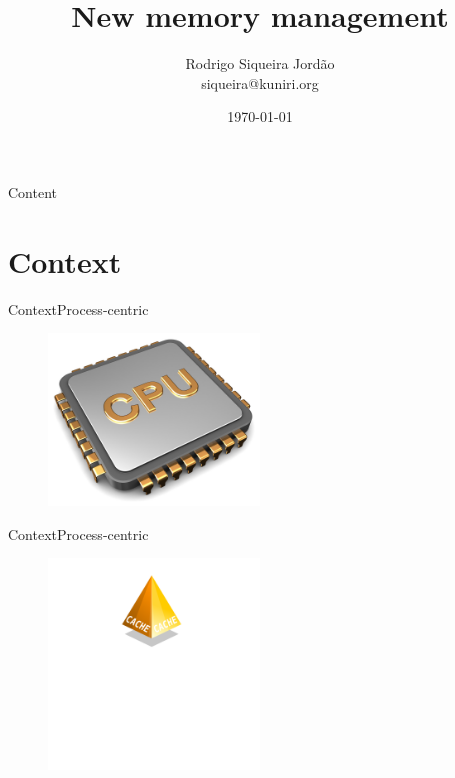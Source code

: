 \documentclass[10pt]{beamer}
\title[] %
{ %
  \textbf{New memory management}
}
\subtitle[SpaceJMP a new approach]
{
}
\author[Rodrigo Siqueira Jordão]
{      Rodrigo Siqueira Jordão \\
      {\ttfamily siqueira@kuniri.org}
}
\institute[]
{
  University of Sao Paulo\\
  Institute of Mathematics and Statistics\\
  
}
\date{\today}
\begin{document}

{\1%
\begin{frame} 
  \titlepage %
\end{frame}}

\begin{frame}[shrink]{Content}{}
  \tableofcontents
\end{frame}

\section{Context}
\begin{frame}{Context}{Process-centric}
  \begin{figure}[ht]
    \centering
    \includegraphics[width=0.5\textwidth, keepaspectratio=true]{images/processor-centric.png}
  \end{figure}
\end{frame}

\begin{frame}{Context}{Process-centric}
  \begin{figure}[ht]
    \centering
    \includegraphics[width=0.5\textwidth, keepaspectratio=true]{images/memory_hierarchy_cache.png}
  \end{figure}
\end{frame}
\end{document}

